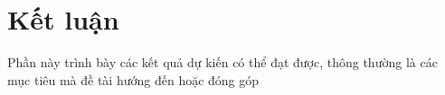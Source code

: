 \section{Kết luận}
\label{sec:compare}

Phần này trình bày các kết quả dự kiến có thể đạt được, thông thường là các mục tiêu mà đề tài hướng đến hoặc đóng góp